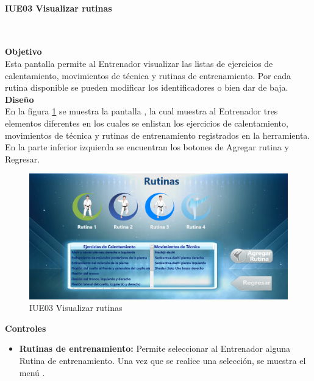 \paragraph{IUE03 Visualizar rutinas} \hspace{1cm}\\ 
\label{pant:IUE03}

\textbf{\textcolor[rgb]{0, 0, 0.545098}{Objetivo}}\\
Esta pantalla permite al Entrenador visualizar las listas de ejercicios de calentamiento, movimientos de técnica y rutinas de entrenamiento. Por cada rutina disponible se pueden modificar los identificadores o bien dar de baja.\\

\textbf{\textcolor[rgb]{0, 0, 0.545098}{Diseño}}\\
En la figura \ref{fig:IUE03} se muestra la pantalla , la cual muestra al Entrenador tres elementos diferentes en los cuales se enlistan los ejercicios de calentamiento, movimientos de técnica y rutinas de entrenamiento registrados en la herramienta.\\

En la parte inferior izquierda se encuentran los botones de Agregar rutina y Regresar.

\begin{figure}[H]
	\centering
		\includegraphics[scale=0.5]{./Figuras/Pantallas/IUE03Visualizar_rutinas}
	\caption{IUE03 Visualizar rutinas}
	\label{fig:IUE03}
\end{figure}

\textbf{\textcolor[rgb]{0, 0, 0.545098}{Controles}}
\begin{itemize}
	\item \textbf{\textcolor[rgb]{0, 0, 0.545098}{Rutinas de entrenamiento:}} Permite seleccionar al Entrenador alguna Rutina de entrenamiento. Una vez que se realice una selección, se muestra el menú .
\end{itemize}
\vspace{1em}

